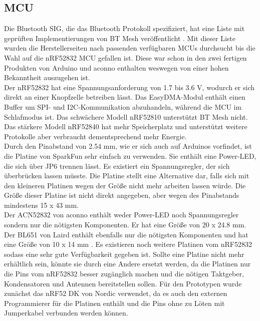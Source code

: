 \subsection{MCU}
Die Bluetooth SIG, die das Bluetooth Protokoll spezifiziert, hat eine Liste mit geprüften Implementierungen von BT Mesh veröffentlicht \cite{site_qualifiedMesh}.
Mit dieser Liste wurden die Herstellerseiten nach passenden verfügbaren MCUs durchsucht bis die Wahl auf die nRF52832 MCU gefallen ist.
Diese war schon in den zwei fertigen Produkten von Arduino und aconno enthalten weswegen von einer hohen Bekanntheit auszugehen ist.\\
Der nRF52832 hat eine Spannungsanforderung von 1.7 bis 3.6 V, wodurch er sich direkt an einer Knopfzelle betreiben lässt.
Das EasyDMA-Modul enthält einen Buffer um SPI- und I2C-Kommunikation abzuhandeln, während die MCU im Schlafmodus ist.
Das schwächere Modell nRF52810 unterstützt BT Mesh nicht.
Das stärkere Modell nRF52840 hat mehr Speicherplatz und unterstützt weitere Protokolle aber verbraucht dementsprechend mehr Energie. \cite{site_nrfProducts}\\
Durch den Pinabstand von 2.54 mm, wie er sich auch auf Arduinos vorfindet, ist die Platine von SparkFun sehr einfach zu verwenden.
Sie enthält eine Power-LED, die sich über JP6 trennen lässt.
Es existiert ein Spannungsregler, der sich überbrücken lassen müsste.
Die Platine stellt eine Alternative dar, falls sich mit den kleineren Platinen wegen der Größe nicht mehr arbeiten lassen würde.
Die Größe dieser Platine ist nicht direkt angegeben, aber wegen des Pinabstands mindestens 15 x 43 mm. \cite{datasheet_nrfSpark}\\
Der ACN52832 von aconno enthält weder Power-LED noch Spannungsregler sondern nur die nötigsten Komponenten.
Er hat eine Größe von 20 x 24.8 mm. \cite{datasheet_nrfAcn}\\
Der BL651 von Laird enthält ebenfalls nur die nötigsten Komponenten und hat eine Größe von 10 x 14 mm \cite{datasheet_nrfLaird}.
Es existieren noch weitere Platinen vom nRF52832 sodass eine sehr gute Verfügbarkeit gegeben ist.
Sollte eine Platine nicht mehr erhältlich sein, könnte sie durch eine Andere ersetzt werden, da die Platinen nur die Pins vom nRF52832 besser zugänglich machen und die nötigen Taktgeber, Kondensatoren und Antennen bereitstellen sollen.
Für den Prototypen wurde zunächst das nRF52 DK von Nordic verwendet, da es auch den externen Programmierer für die Platinen enthält und die Pins ohne zu Löten mit Jumperkabel verbunden werden können.

